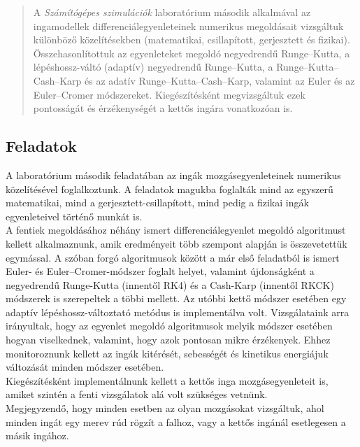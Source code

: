 \begin{abstract}
    \noindent A \emph{Számítógépes szimulációk} laboratórium második alkalmával az ingamodellek differenciálegyenleteinek numerikus megoldásait vizsgáltuk különböző közelítésekben (matematikai, csillapított, gerjesztett és fizikai). Összehasonlítottuk az egyenleteket megoldó negyedrendű Runge--Kutta, a lépéshossz-váltó (adaptív) negyedrendű Runge--Kutta, a Runge--Kutta--Cash--Karp és az adatív Runge--Kutta--Cash--Karp, valamint az Euler és az Euler--Cromer módszereket. Kiegészítésként megvizsgáltuk ezek pontosságát és érzékenységét a kettős ingára vonatkozóan is. \\
\end{abstract}

\begin{multicols}{2}

\section{Feladatok} \label{sec:1}
A laboratórium második feladatában az ingák mozgásegyenleteinek numerikus közelítésével foglalkoztunk. A feladatok magukba foglalták mind az egyszerű matematikai, mind a gerjesztett-csillapított, mind pedig a fizikai ingák egyenleteivel történő munkát is. \\
A fentiek megoldásához néhány ismert differenciálegyenlet megoldó algoritmust kellett alkalmaznunk, amik eredményeit több szempont alapján is összevetettük egymással. A szóban forgó algoritmusok között a már első feladatból is ismert Euler- és Euler--Cromer-módszer foglalt helyet, valamint újdonságként a negyedrendű Runge-Kutta (innentől RK4) és a Cash-Karp (innentől RKCK) módszerek is szerepeltek a többi mellett. Az utóbbi kettő módszer esetében egy adaptív lépéshossz-változtató metódus is implementálva volt. Vizsgálataink arra irányultak, hogy az egyenlet megoldó algoritmusok melyik módszer esetében hogyan viselkednek, valamint, hogy azok pontosan mikre érzékenyek. Ehhez monitoroznunk kellett az ingák kitérését, sebességét és kinetikus energiájuk változását minden módszer esetében. \\
Kiegészítésként implementálnunk kellett a kettős inga mozgásegyenleteit is, amiket szintén a fenti vizsgálatok alá volt szükséges vetnünk. \\
Megjegyzendő, hogy minden esetben az olyan mozgásokat vizsgáltuk, ahol minden ingát egy merev rúd rögzít a falhoz, vagy a kettős ingánál esetlegesen a másik ingához.


\end{multicols}
